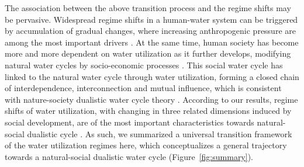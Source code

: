 \documentclass[9pt, twocolumn, twoside, lineno]{pnas-new}
\begin{document}
The association between the above transition process and the regime shifts may be pervasive.
Widespread regime shifts in a human-water system can be triggered by accumulation of gradual changes, where increasing anthropogenic pressure are among the most important drivers \cite{rochaCascadingRegimeShifts2018,falkenmarkUnderstandingWaterResilience2019}. 
At the same time, human society has become more and more dependent on water utilization as it further develops, modifying natural water cycles by socio-economic processes \cite{gleesonIlluminatingWaterCycle2020,dibaldassarreSociohydrologyScientificChallenges2019}.
This social water cycle has linked to the natural water cycle through water utilization, forming a closed chain of interdependence, interconnection and mutual influence, which is consistent with nature-society dualistic water cycle theory
\cite{qinTheoreticalFrameworkDualistic2014,liuDualisticWaterCycle2010}.
According to our results, regime shifts of water utilization, with changing in three related dimensions induced by social development, are of the most important characteristics towards natural-social dualistic cycle
\cite{cummingImplicationsAgriculturalTransitions2014,cummingLinkingEconomicGrowth2018}.
As such, we summarized a universal transition framework of the water utilization regimes here, which conceptualizes a general trajectory towards a natural-social dualistic water cycle (Figure~\ref{fig:summary}).
\end{document}
